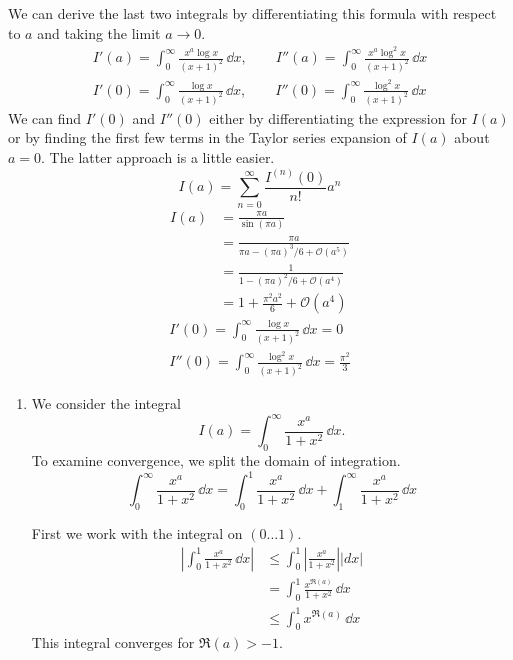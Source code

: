 {\begin{Solution}
  We can derive the last two integrals by differentiating this formula with 
  respect to $a$ and taking the limit $a \to 0$.  
  \begin{gather*}
    I'(a) = \int_0^\infty \frac{x^a \log x}{(x+1)^2}\,\dd x, \qquad
    I''(a) = \int_0^\infty \frac{x^a \log^2 x}{(x+1)^2}\,\dd x \\
    I'(0) = \int_0^\infty \frac{\log x}{(x+1)^2}\,\dd x, \qquad
    I''(0) = \int_0^\infty \frac{\log^2 x}{(x+1)^2}\,\dd x 
  \end{gather*}
  We can find $I'(0)$ and $I''(0)$ either by differentiating the 
  expression for $I(a)$ or by finding the first few terms in the 
  Taylor series expansion of $I(a)$ about $a = 0$.  The latter approach
  is a little easier.
  \[
  I(a) = \sum_{n = 0}^\infty \frac{ I^{(n)}(0) }{ n! } a^n
  \]
  \begin{align*}
    I(a)    &= \frac{\pi a}{\sin (\pi a)} \\
    &= \frac{\pi a}{ \pi a - (\pi a)^3 / 6 + \mathcal{O}(a^5) } \\
    &= \frac{1}{1 - (\pi a)^2 / 6 + \mathcal{O}(a^4) } \\
    &= 1 + \frac{\pi^2 a^2}{6} + \mathcal{O}(a^4)
  \end{align*}
  \begin{gather*}
    \boxed{
      I'(0) = \int_0^\infty \frac{\log x}{(x+1)^2} \,\dd x = 0
      } \\
    \boxed{
      I''(0) = \int_0^\infty \frac{\log^2 x}{(x+1)^2} \,\dd x = \frac{\pi^2}{3}
      }
  \end{gather*}
\end{Solution}











\begin{Solution}
  \label{solution x^a/(1+x^2)}
  \begin{enumerate}
  \item
    We consider the integral
    \[
    I(a) = \int_0^\infty \frac{x^a}{1 + x^2}\,\dd x.
    \]
    To examine convergence, we split the domain of integration.
    \[
    \int_0^\infty \frac{x^a}{1+x^2}\,\dd x
    = \int_0^1 \frac{x^a}{1+x^2}\,\dd x
    + \int_1^\infty \frac{x^a}{1+x^2}\,\dd x
    \]

    First we work with the integral on $(0 \ldots 1)$.
    \begin{align*}
      \left| \int_0^1 \frac{x^a}{1+x^2}\,\dd x \right|
      &\leq \int_0^1 \left| \frac{x^a}{1+x^2} \right|
       \left| d x \right| \\
      &= \int_0^1 \frac{x^{\Re(a)}}{1+x^2} \,\dd x \\
      &\leq \int_0^1 x^{\Re(a)} \,\dd x
    \end{align*}
    This integral converges for $\Re(a) > -1$.


\end{enumerate}
\end{Solution}}
